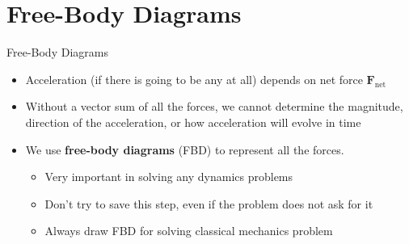 \documentclass[12pt,compress,aspectratio=169]{beamer}
\newcommand{\pic}[2]{\texttt{[image: \#2]}}
\newcommand{\eq}[2]{\vspace{#1}{\Large\begin{displaymath}#2\end{displaymath}}}
\begin{document}
%
%
%
%  
%



\section{Free-Body Diagrams}

\begin{frame}{Free-Body Diagrams}
  \begin{itemize}
  \item Acceleration (if there is going to be any at all) depends
    on net force $\bm{F}_\text{net}$
  \item Without a vector sum of all the forces, we cannot determine the
    magnitude, direction of the acceleration, or how acceleration will evolve
    in time
  \item We use \textbf{free-body diagrams} (FBD) to represent all the forces.
    \begin{itemize}
    \item Very important in solving any dynamics problems
    \item Don't try to save this step, even if the problem does not ask for it
    \item Always draw FBD for solving classical mechanics problem
    \end{itemize}
  \end{itemize}
\end{frame}
\end{document}
